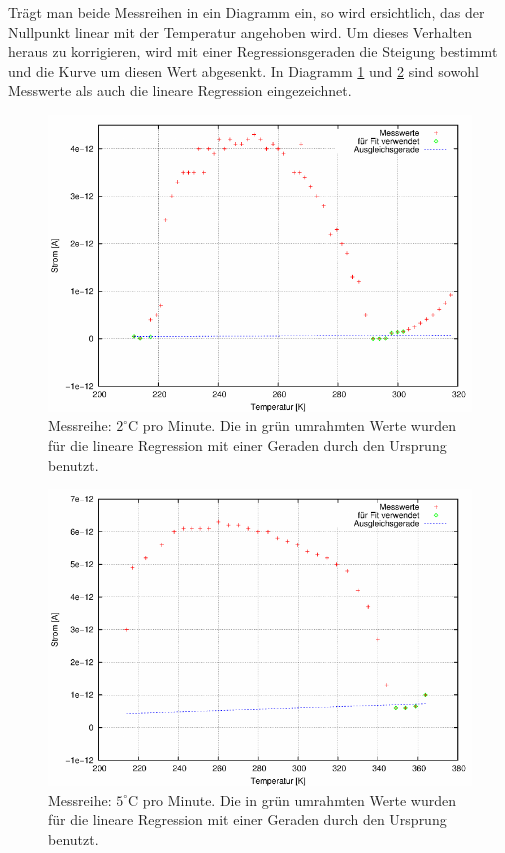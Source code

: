 Trägt man beide Messreihen in ein Diagramm ein, so wird ersichtlich, das der Nullpunkt linear mit der Temperatur angehoben wird. Um dieses Verhalten heraus zu korrigieren, wird mit einer Regressionsgeraden die Steigung bestimmt und die Kurve um diesen Wert abgesenkt. In Diagramm \ref{pic_dia1} und \ref{pic_dia2} sind sowohl Messwerte als auch die lineare Regression eingezeichnet.

\begin{figure}[htbp]
\includegraphics[scale=0.8]{../gnu/relax11.pdf}
\caption{Messreihe: $2^\circ$C pro Minute. Die in grün umrahmten Werte wurden für die lineare Regression mit einer Geraden durch den Ursprung benutzt.}
\label{pic_dia1}
\end{figure}
\begin{figure}[htbp]
\includegraphics[scale=0.8]{../gnu/relax12.pdf}
\caption{Messreihe: $5^\circ$C pro Minute. Die in grün umrahmten Werte wurden für die lineare Regression mit einer Geraden durch den Ursprung benutzt.}
\label{pic_dia2}
\end{figure}

